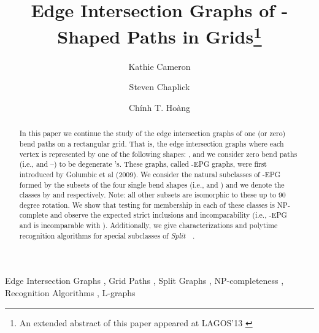 \documentclass[11pt,3p,times]{elsarticle}
\begin{document}
\author[author1]{Kathie Cameron}
\author[author2]{Steven Chaplick}
\author[author3]{Ch\'inh T. Ho\`ang}	

\address[author1]{Department of Mathematics, Wilfrid Laurier University, Waterloo, ON, Canada. Email: {\tt kcameron@wlu.ca}}

\address[author2]{Institut f\"ur Mathematik, Technische Universit\"at Berlin, Berlin, Germany. Email: {\tt chaplick@math.tu-berlin.de}}

\address[author3]{Department of Physics and Computer Science, Wilfrid Laurier University, Waterloo, ON, Canada. Email: {\tt choang@wlu.ca} }


\begin{frontmatter}


\title{Edge Intersection Graphs of -Shaped Paths in Grids\footnote{An extended abstract of this paper appeared at LAGOS'13 \cite{Cameron2013363}}}



\begin{abstract}
In this paper we continue the study of the edge intersection graphs of one (or zero) bend paths on a rectangular grid. That is, the edge intersection graphs where each vertex is represented by one of the following shapes: , and we consider zero bend paths (i.e.,  and --) to be degenerate 's. 
These graphs, called -EPG graphs, were first introduced by Golumbic et al (2009). 
We consider the natural subclasses of -EPG formed by the subsets of the four single bend shapes (i.e.,  and ) and we denote the classes by  and  respectively. Note: all other subsets are isomorphic to these up to 90 degree rotation.
We show that testing for membership in each of these classes is NP-complete and observe the expected strict inclusions and incomparability (i.e., -EPG
and  is incomparable with ). Additionally, we give characterizations and polytime recognition algorithms for special subclasses of \textit{Split}~~. 
\end{abstract}

\begin{keyword}
Edge Intersection Graphs \sep
Grid Paths \sep
Split Graphs \sep
NP-completeness \sep
Recognition Algorithms \sep
L-graphs
\end{keyword}

\end{frontmatter}
\end{document}
